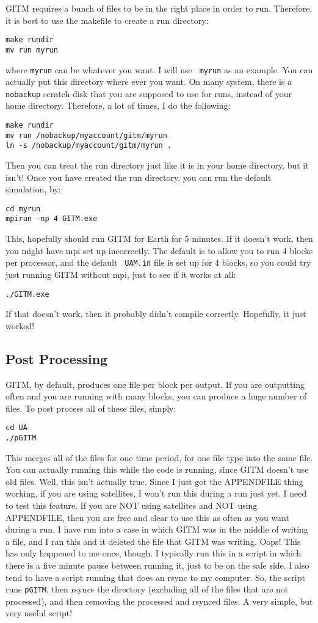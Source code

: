 GITM requires a bunch of files to be in the right place in order to
run.  Therefore, it is best to use the makefile to create a run
directory:
\begin{verbatim}
make rundir
mv run myrun
\end{verbatim}
where {\tt myrun} can be whatever you want.  I will use {\tt
myrun} as an example.  You can actually put this directory where ever
you want.  On many system, there is a {\tt nobackup} scratch disk that
you are supposed to use for runs, instead of your home directory.
Therefore, a lot of times, I do the following:
\begin{verbatim}
make rundir
mv run /nobackup/myaccount/gitm/myrun
ln -s /nobackup/myaccount/gitm/myrun .
\end{verbatim}
Then you can treat the run directory just like it is in your home
directory, but it isn't! Once you have created the run directory, you
can run the default simulation, by:
\begin{verbatim}
cd myrun
mpirun -np 4 GITM.exe
\end{verbatim}
This, hopefully should run GITM for Earth for 5 minutes.  If it
doesn't work, then you might have mpi set up incorrectly.  The default
is to allow you to run 4 blocks per processor, and the default {\tt
UAM.in} file is set up for 4 blocks, so you could try just running
GITM without mpi, just to see if it works at all:
\begin{verbatim}
./GITM.exe
\end{verbatim}
If that doesn't work, then it probably didn't compile correctly.
Hopefully, it just worked!

\subsection{Post Processing}

GITM, by default, produces one file per block per output.  If you are
outputting often and you are running with many blocks, you can produce
a huge number of files.  To post process all of these files, simply:
\begin{verbatim}
cd UA
./pGITM
\end{verbatim}
This merges all of the files for one time period, for one file type
into the same file.  You can actually running this while the code is
running, since GITM doesn't use old files.  Well, this isn't actually
true.  Since I just got the APPENDFILE thing working, if you are using
satellites, I won't run this during a run just yet.  I need to test
this feature.  If you are NOT using satellites and NOT using
APPENDFILE, then you are free and clear to use this as often as you
want during a run.  I have run into a case in which GITM was in the
middle of writing a file, and I ran this and it deleted the file that
GITM was writing.  Oops!  This has only happened to me once, though.
I typically run this in a script in which there is a five minute pause
between running it, just to be on the safe side.  I also tend to have
a script running that does an rsync to my computer.  So, the script
runs {\tt pGITM}, then rsyncs the directory (excluding all of the
files that are not processed), and then removing the processed and
rsynced files.  A very simple, but very useful script!


